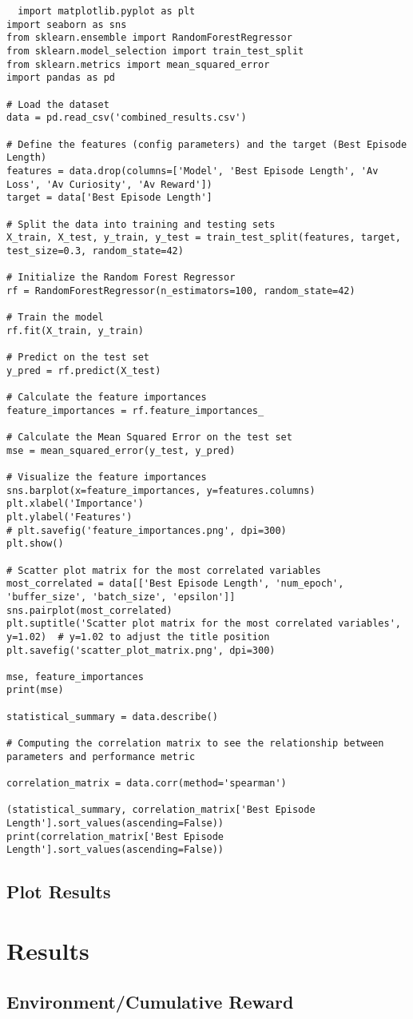 \begin{lstlisting}
  import matplotlib.pyplot as plt
import seaborn as sns
from sklearn.ensemble import RandomForestRegressor
from sklearn.model_selection import train_test_split
from sklearn.metrics import mean_squared_error
import pandas as pd

# Load the dataset
data = pd.read_csv('combined_results.csv')

# Define the features (config parameters) and the target (Best Episode Length)
features = data.drop(columns=['Model', 'Best Episode Length', 'Av Loss', 'Av Curiosity', 'Av Reward'])
target = data['Best Episode Length']

# Split the data into training and testing sets
X_train, X_test, y_train, y_test = train_test_split(features, target, test_size=0.3, random_state=42)

# Initialize the Random Forest Regressor
rf = RandomForestRegressor(n_estimators=100, random_state=42)

# Train the model
rf.fit(X_train, y_train)

# Predict on the test set
y_pred = rf.predict(X_test)

# Calculate the feature importances
feature_importances = rf.feature_importances_

# Calculate the Mean Squared Error on the test set
mse = mean_squared_error(y_test, y_pred)

# Visualize the feature importances
sns.barplot(x=feature_importances, y=features.columns)
plt.xlabel('Importance')
plt.ylabel('Features')
# plt.savefig('feature_importances.png', dpi=300)
plt.show()

# Scatter plot matrix for the most correlated variables
most_correlated = data[['Best Episode Length', 'num_epoch', 'buffer_size', 'batch_size', 'epsilon']]
sns.pairplot(most_correlated)
plt.suptitle('Scatter plot matrix for the most correlated variables', y=1.02)  # y=1.02 to adjust the title position
plt.savefig('scatter_plot_matrix.png', dpi=300)

mse, feature_importances
print(mse)

statistical_summary = data.describe()

# Computing the correlation matrix to see the relationship between parameters and performance metric

correlation_matrix = data.corr(method='spearman')

(statistical_summary, correlation_matrix['Best Episode Length'].sort_values(ascending=False))
print(correlation_matrix['Best Episode Length'].sort_values(ascending=False))
\end{lstlisting}

\subsection{Plot Results}\label{sec:plot_results}

\section{Results}

\subsection{Environment/Cumulative Reward}\label{sec:env_cum_reward}





\